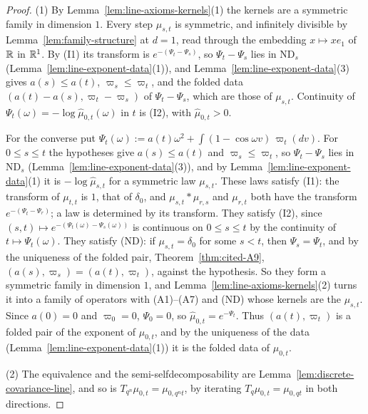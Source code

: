 \begin{proof}
(1) By Lemma~\ref{lem:line-axioms-kernels}(1) the kernels are a symmetric family in dimension
$1$. Every step $\mu_{s,t}$ is symmetric, and infinitely divisible by
Lemma~\ref{lem:family-structure} at $d = 1$, read through the embedding $x \mapsto xe_1$ of $\mathbb{R}$
in $\mathbb{R}^1$. By (I1) its transform is $e^{-(\Psi_t - \Psi_s)}$, so $\Psi_t - \Psi_s$ lies in
$\mathrm{ND}_s$ (Lemma~\ref{lem:line-exponent-data}(1)), and Lemma~\ref{lem:line-exponent-data}(3)
gives $a(s) \le a(t)$, $\varpi_s \le \varpi_t$, and the folded data
$(a(t) - a(s), \varpi_t - \varpi_s)$ of $\Psi_t - \Psi_s$, which are those of $\mu_{s,t}$.
Continuity of $\Psi_t(\omega) = -\log\widehat\mu_{0,t}(\omega)$ in $t$ is (I2), with
$\widehat\mu_{0,t} > 0$.

For the converse put $\Psi_t(\omega) := a(t)\omega^2 + \int(1 - \cos\omega v)\,\varpi_t(dv)$. For
$0 \le s \le t$ the hypotheses give $a(s) \le a(t)$ and $\varpi_s \le \varpi_t$, so
$\Psi_t - \Psi_s$ lies in $\mathrm{ND}_s$ (Lemma~\ref{lem:line-exponent-data}(3)), and by
Lemma~\ref{lem:line-exponent-data}(1) it is $-\log\widehat\mu_{s,t}$ for a symmetric law
$\mu_{s,t}$. These laws satisfy (I1): the transform of $\mu_{t,t}$ is $1$, that of $\delta_0$,
and $\mu_{s,t} * \mu_{r,s}$ and $\mu_{r,t}$ both have the transform $e^{-(\Psi_t - \Psi_r)}$; a law
is determined by its transform. They satisfy (I2), since
$(s,t) \mapsto e^{-(\Psi_t(\omega) - \Psi_s(\omega))}$ is continuous on $0 \le s \le t$ by the
continuity of $t \mapsto \Psi_t(\omega)$. They satisfy (ND): if $\mu_{s,t} = \delta_0$ for some
$s < t$, then $\Psi_s = \Psi_t$, and by the uniqueness of the folded pair, Theorem~\ref{thm:cited-A9},
$(a(s), \varpi_s) = (a(t), \varpi_t)$, against the hypothesis. So they form a symmetric family in
dimension $1$, and Lemma~\ref{lem:line-axioms-kernels}(2) turns it into a family of operators with
(A1)--(A7) and (ND) whose kernels are the $\mu_{s,t}$. Since $a(0) = 0$ and $\varpi_0 = 0$,
$\Psi_0 = 0$, so $\widehat\mu_{0,t} = e^{-\Psi_t}$. Thus $(a(t), \varpi_t)$ is a folded pair of
the exponent of $\mu_{0,t}$, and by the uniqueness of the data
(Lemma~\ref{lem:line-exponent-data}(1)) it is the folded data of $\mu_{0,t}$.

(2) The equivalence and the semi-selfdecomposability are
Lemma~\ref{lem:discrete-covariance-line}, and so is $T_{q^n}\mu_{0,t} = \mu_{0,q^nt}$, by
iterating $T_q\mu_{0,t} = \mu_{0,qt}$ in both directions.


\end{proof}
